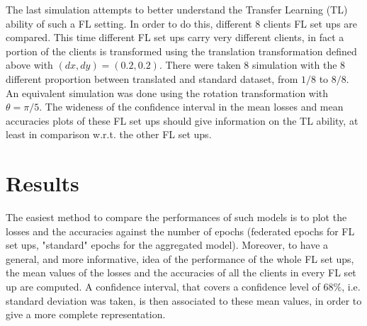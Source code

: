 \documentclass{article} %
\newcounter{other}
\newcounter{late}
\begin{document}
The last simulation attempts to better understand the Transfer Learning (TL) ability of such a FL setting.
In order to do this, different 8 clients FL set ups are compared.
This time different FL set ups carry very different clients, in fact a portion of the clients 
is transformed using the translation transformation defined above with $(dx, dy)=(0.2, 0.2)$.
There were taken 8 simulation with the 8 different proportion between translated and standard 
dataset, from $1/8$ to $8/8$.
An equivalent simulation was done using the rotation transformation with $\theta=\pi/5$.
The wideness of the confidence interval in the mean losses and mean accuracies 
plots of these FL set ups should give information on the TL ability, at least in 
comparison w.r.t. the other FL set ups.

\section {Results}
The easiest method to compare the performances of such models is to plot 
the losses and the accuracies against the number of epochs (federated epochs for FL set 
ups, "standard" epochs for the aggregated model).
Moreover, to have a general, and more informative, idea of the performance of the whole FL 
set ups, the mean values of the losses and the accuracies of all the clients in every FL 
set up are computed.
A confidence interval, that covers a confidence level of $68\%$, i.e. standard deviation
was taken, is then associated to these mean values, in order to give a more complete 
representation.
\end{document}
